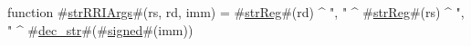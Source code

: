 function #\hyperref[zstrRRIArgs]{strRRIArgs}#(rs, rd, imm) = #\hyperref[zstrReg]{strReg}#(rd) ^ ", " ^ #\hyperref[zstrReg]{strReg}#(rs) ^ ", " ^ #\hyperref[zdeczystr]{dec\_str}#(#\hyperref[zsigned]{signed}#(imm))
